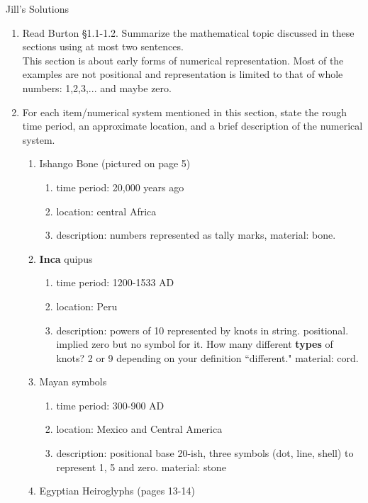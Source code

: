 \documentclass[12pt]{article}
\renewcommand{\emph}[1]{\textsf{\textbf{#1}}}
\begin{document}
\begin{center}{Jill's Solutions}\end{center}
\begin{enumerate}

\item Read Burton \S 1.1-1.2. Summarize the mathematical topic discussed in these sections using at most two sentences.\\

This section is about early forms of numerical representation. Most of the examples are not positional and representation is limited to that of whole numbers: 1,2,3,... and maybe zero.\\

\item For each item/numerical system mentioned in this section, state the rough time period, an approximate location, and a brief description of the numerical system.
	\begin{enumerate}
	\item Ishango Bone (pictured on page   5)
		\begin{enumerate}
		\item time period: 20,000 years ago
		\item location: central Africa
		\item description: numbers represented as tally marks, material: bone.
		\vfill
		\end{enumerate}
	\item \textbf{Inca} quipus 
		\begin{enumerate}
		\item time period: 1200-1533 AD
		\item location: Peru
		\item description: powers of 10 represented by knots in string. positional. implied zero but no symbol for it. How many different \emph{types} of knots? 2 or 9 depending on your definition ``different." material: cord.
		\vfill
		\end{enumerate}
	\item Mayan symbols
		\begin{enumerate}
		\item time period: 300-900 AD
		\item location: Mexico and Central America
		\item description: positional base 20-ish, three symbols (dot, line, shell) to  represent 1, 5 and zero. material: stone
		\vfill
		\end{enumerate}
	\item Egyptian Heiroglyphs (pages 13-14)

\end{enumerate}
\end{enumerate}
\end{document}
